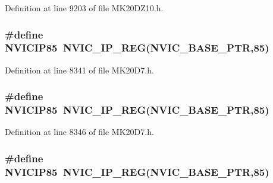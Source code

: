 Definition at line 9203 of file M\+K20\+D\+Z10.\+h.

\subsubsection[{\texorpdfstring{N\+V\+I\+C\+I\+P85}{NVICIP85}}]{\setlength{\rightskip}{0pt plus 5cm}\#define N\+V\+I\+C\+I\+P85~{\bf N\+V\+I\+C\+\_\+\+I\+P\+\_\+\+R\+EG}({\bf N\+V\+I\+C\+\_\+\+B\+A\+S\+E\+\_\+\+P\+TR},85)}\hypertarget{group___n_v_i_c___register___accessor___macros_ga72e140239f4442e84a2604e25f6811ce}{}\label{group___n_v_i_c___register___accessor___macros_ga72e140239f4442e84a2604e25f6811ce}


Definition at line 8341 of file M\+K20\+D7.\+h.

\subsubsection[{\texorpdfstring{N\+V\+I\+C\+I\+P85}{NVICIP85}}]{\setlength{\rightskip}{0pt plus 5cm}\#define N\+V\+I\+C\+I\+P85~{\bf N\+V\+I\+C\+\_\+\+I\+P\+\_\+\+R\+EG}({\bf N\+V\+I\+C\+\_\+\+B\+A\+S\+E\+\_\+\+P\+TR},85)}\hypertarget{group___n_v_i_c___register___accessor___macros_ga72e140239f4442e84a2604e25f6811ce}{}\label{group___n_v_i_c___register___accessor___macros_ga72e140239f4442e84a2604e25f6811ce}


Definition at line 8346 of file M\+K20\+D7.\+h.

\subsubsection[{\texorpdfstring{N\+V\+I\+C\+I\+P85}{NVICIP85}}]{\setlength{\rightskip}{0pt plus 5cm}\#define N\+V\+I\+C\+I\+P85~{\bf N\+V\+I\+C\+\_\+\+I\+P\+\_\+\+R\+EG}({\bf N\+V\+I\+C\+\_\+\+B\+A\+S\+E\+\_\+\+P\+TR},85)}\hypertarget{group___n_v_i_c___register___accessor___macros_ga72e140239f4442e84a2604e25f6811ce}{}\label{group___n_v_i_c___register___accessor___macros_ga72e140239f4442e84a2604e25f6811ce}



